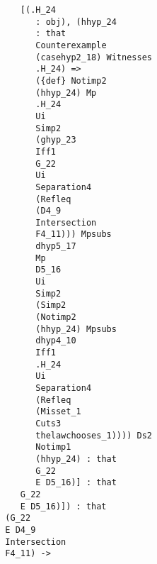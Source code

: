 \documentclass[12pt]{article}
\begin{document}
\begin{verbatim}
                                           [(.H_24 
                                              : obj), (hhyp_24 
                                              : that 
                                              Counterexample 
                                              (casehyp2_18) Witnesses 
                                              .H_24) => 
                                              ({def} Notimp2 
                                              (hhyp_24) Mp 
                                              .H_24 
                                              Ui 
                                              Simp2 
                                              (ghyp_23 
                                              Iff1 
                                              G_22 
                                              Ui 
                                              Separation4 
                                              (Refleq 
                                              (D4_9 
                                              Intersection 
                                              F4_11))) Mpsubs 
                                              dhyp5_17 
                                              Mp 
                                              D5_16 
                                              Ui 
                                              Simp2 
                                              (Simp2 
                                              (Notimp2 
                                              (hhyp_24) Mpsubs 
                                              dhyp4_10 
                                              Iff1 
                                              .H_24 
                                              Ui 
                                              Separation4 
                                              (Refleq 
                                              (Misset_1 
                                              Cuts3 
                                              thelawchooses_1)))) Ds2 
                                              Notimp1 
                                              (hhyp_24) : that 
                                              G_22 
                                              E D5_16)] : that 
                                           G_22 
                                           E D5_16)]) : that 
                                        (G_22 
                                        E D4_9 
                                        Intersection 
                                        F4_11) -> 

\end{verbatim}
\end{document}
